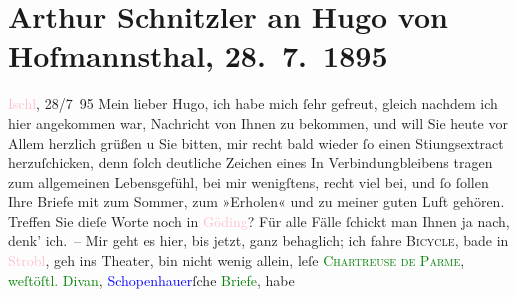 

               \section[Arthur Schnitzler an Hugo von Hofmannsthal, 28. 7. 1895]{ Arthur Schnitzler an Hugo von Hofmannsthal, 28. 7. 1895}\nopagebreak{}\rehead{ }\normalsize\beginnumbering{} \toendnotes[C]{\smallbreak\pagebreak[2]} 
\toendnotes[C]{\smallbreak}\pstart
           \raggedleft{}{\pb}\textcolor{pink}{Ischl}{}\ledrightnote{\textcolor{pink}{Bad Ischl}}, 28/7 95\pend
           \pstart
           Mein lieber Hugo, ich habe mich ſehr gefreut, gleich nachdem ich
               hier angekommen war, Nachricht von Ihnen zu bekommen, und will Sie heute vor Allem
               herzlich grüßen u Sie bitten, mir recht bald wieder ſo einen Sti{\geminationm}ungsextract herzuſchicken, denn ſolch deutliche Zeichen
               eines In Verbindungbleibens tragen zum allgemeinen Lebensgefühl, bei mir wenigſtens,
               recht viel bei, und ſo ſollen {\pb}Ihre Briefe mit zum
               Sommer, zum »Erholen« und zu meiner guten Luft gehören. Treffen Sie dieſe Worte noch
               in \textcolor{pink}{Göding}{}\ledrightnote{\textcolor{pink}{Hodonín}}? Für alle Fälle ſchickt man Ihnen ja
               nach, denk’ ich. – Mir geht es hier, bis jetzt, ganz behaglich; ich fahre \textsc{Bicycle}, bade in \textcolor{pink}{Strobl}{}\ledrightnote{\textcolor{pink}{Strobl}},
               geh ins Theater, bin nicht wenig allein, leſe \textcolor{green}{\textsc{Chartreuse de Parme}}{}\ledrightnote{\textcolor{green}{Die Kartause von Parma}}, \textcolor{green}{weſtöſtl. Divan}{}\ledrightnote{\textcolor{green}{West-östlicher Divan}}, \textcolor{blue}{Schopenhauer}{}\ledrightnote{\textcolor{blue}{Arthur Schopenhauer}}ſche \textcolor{green}{Briefe}{}\ledrightnote{\textcolor{green}{Schopenhauer-Briefe}}, habe
